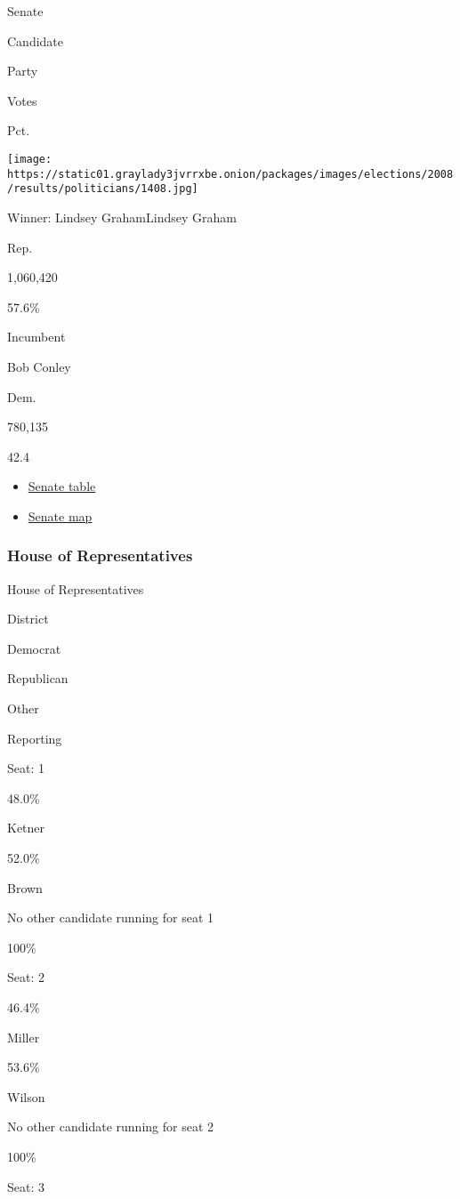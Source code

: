 Senate

Candidate

Party

Votes

Pct.~~~

\texttt{[image: https://static01.graylady3jvrrxbe.onion/packages/images/elections/2008/results/politicians/1408.jpg]}

Winner: Lindsey GrahamLindsey Graham

Rep.

1,060,420

57.6\%

Incumbent

Bob Conley

Dem.

780,135

42.4~~~

\begin{itemize}
\tightlist
\item
  \href{../senate/votes.html}{Senate table}
\item
  \href{../senate/map.html}{Senate map}
\end{itemize}

\hypertarget{house-of-representatives}{%
\subsubsection{House of
Representatives}\label{house-of-representatives}}

House of Representatives

District

Democrat

Republican

Other

Reporting

Seat: 1

48.0\%

Ketner

52.0\%

Brown

No other candidate running for seat 1

100\%

Seat: 2

46.4\%

Miller

53.6\%

Wilson

No other candidate running for seat 2

100\%

Seat: 3

